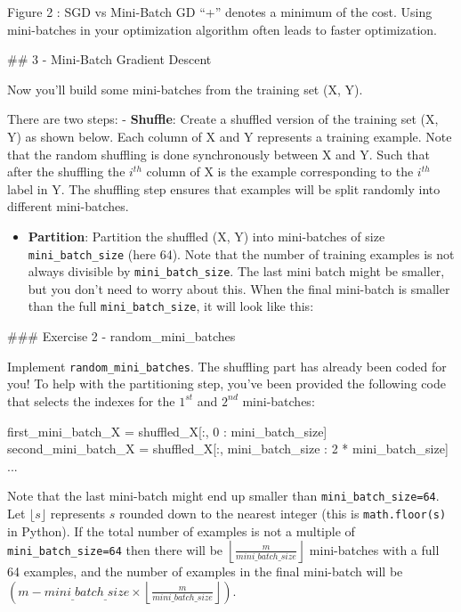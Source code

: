 \documentclass[11pt]{article}
\providecommand{\tightlist}{%
      \setlength{\itemsep}{0pt}\setlength{\parskip}{0pt}}
\newenvironment{Shaded}{}{}
\newcommand{\DecValTok}[1]{\textcolor[rgb]{0.25,0.63,0.44}{{#1}}}
\newcommand{\NormalTok}[1]{{#1}}
\newcommand{\OperatorTok}[1]{\textcolor[rgb]{0.40,0.40,0.40}{{#1}}}
\begin{document}
Figure 2 : SGD vs Mini-Batch GD ``+'' denotes a minimum of the cost.
Using mini-batches in your optimization algorithm often leads to faster
optimization.

    \#\# 3 - Mini-Batch Gradient Descent

Now you'll build some mini-batches from the training set (X, Y).

There are two steps: - \textbf{Shuffle}: Create a shuffled version of
the training set (X, Y) as shown below. Each column of X and Y
represents a training example. Note that the random shuffling is done
synchronously between X and Y. Such that after the shuffling the
\(i^{th}\) column of X is the example corresponding to the \(i^{th}\)
label in Y. The shuffling step ensures that examples will be split
randomly into different mini-batches.

\begin{itemize}
\tightlist
\item
  \textbf{Partition}: Partition the shuffled (X, Y) into mini-batches of
  size \texttt{mini\_batch\_size} (here 64). Note that the number of
  training examples is not always divisible by
  \texttt{mini\_batch\_size}. The last mini batch might be smaller, but
  you don't need to worry about this. When the final mini-batch is
  smaller than the full \texttt{mini\_batch\_size}, it will look like
  this:
\end{itemize}

\#\#\# Exercise 2 - random\_mini\_batches

Implement \texttt{random\_mini\_batches}. The shuffling part has already
been coded for you! To help with the partitioning step, you've been
provided the following code that selects the indexes for the \(1^{st}\)
and \(2^{nd}\) mini-batches:

\begin{Shaded}
\begin{Highlighting}[]
\NormalTok{first\_mini\_batch\_X }\OperatorTok{=}\NormalTok{ shuffled\_X[:, }\DecValTok{0}\NormalTok{ : mini\_batch\_size]}
\NormalTok{second\_mini\_batch\_X }\OperatorTok{=}\NormalTok{ shuffled\_X[:, mini\_batch\_size : }\DecValTok{2} \OperatorTok{*}\NormalTok{ mini\_batch\_size]}
\NormalTok{...}
\end{Highlighting}
\end{Shaded}

Note that the last mini-batch might end up smaller than
\texttt{mini\_batch\_size=64}. Let \(\lfloor s \rfloor\) represents
\(s\) rounded down to the nearest integer (this is
\texttt{math.floor(s)} in Python). If the total number of examples is
not a multiple of \texttt{mini\_batch\_size=64} then there will be
\(\left\lfloor \frac{m}{mini\_batch\_size}\right\rfloor\) mini-batches
with a full 64 examples, and the number of examples in the final
mini-batch will be
\(\left(m-mini_\_batch_\_size \times \left\lfloor \frac{m}{mini\_batch\_size}\right\rfloor\right)\).
\end{document}
